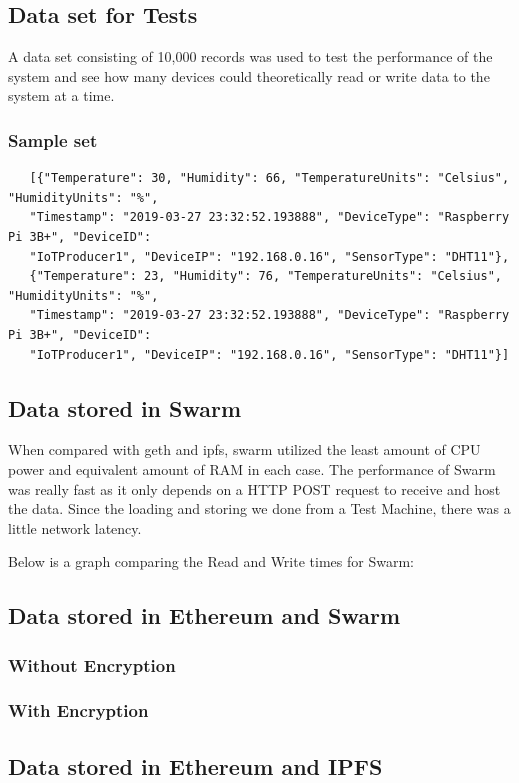 \documentclass[11pt,openright]{report}
\begin{document}
\subsection{Data set for Tests}
A data set consisting of 10,000 records was used to test the performance of the system and see how many devices could theoretically read or write data to the system at a time.

\subsubsection{Sample set}
\begin{verbatim}
   [{"Temperature": 30, "Humidity": 66, "TemperatureUnits": "Celsius", "HumidityUnits": "%",
   "Timestamp": "2019-03-27 23:32:52.193888", "DeviceType": "Raspberry Pi 3B+", "DeviceID":
   "IoTProducer1", "DeviceIP": "192.168.0.16", "SensorType": "DHT11"}, 
   {"Temperature": 23, "Humidity": 76, "TemperatureUnits": "Celsius", "HumidityUnits": "%",
   "Timestamp": "2019-03-27 23:32:52.193888", "DeviceType": "Raspberry Pi 3B+", "DeviceID":
   "IoTProducer1", "DeviceIP": "192.168.0.16", "SensorType": "DHT11"}]
\end{verbatim}

\subsection{Data stored in Swarm}
When compared with geth and ipfs, swarm utilized the least amount of CPU power and equivalent amount of RAM in each case. The performance of Swarm was really fast as it only depends on a HTTP POST request to receive and host the data. Since the loading and storing we done from a Test Machine, there was a little network latency.

Below is a graph comparing the Read and Write times for Swarm:


\subsection{Data stored in Ethereum and Swarm}
\subsubsection{Without Encryption}
\subsubsection{With Encryption}

\subsection{Data stored in Ethereum and IPFS}
\end{document}
